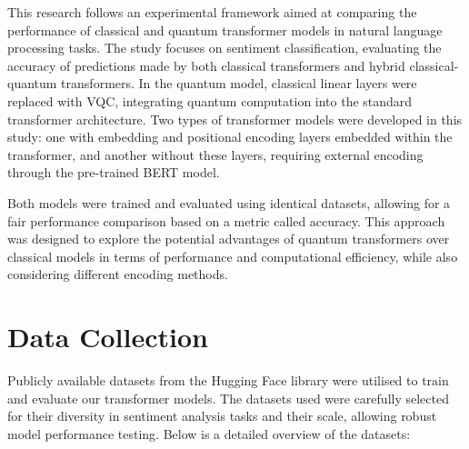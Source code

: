 This research follows an experimental framework aimed at comparing
the performance of classical and quantum transformer models in
natural language processing tasks. The study focuses on sentiment
classification, evaluating the accuracy of predictions made by both
classical transformers and hybrid classical-quantum transformers. In
the quantum model, classical linear layers were replaced with
\acrfull{VQC}, integrating quantum computation
into the standard transformer architecture. Two
types of transformer models were developed in this study: one with
embedding and positional encoding layers embedded within the
transformer, and another without these layers, requiring external
encoding through the pre-trained \gls{BERT} model.

Both models were trained and evaluated using identical datasets,
allowing for a fair performance comparison based on a metric called
accuracy. This approach was designed to explore the
potential advantages of quantum transformers over classical models in
terms of performance and computational efficiency, while also
considering different encoding methods.

\section{Data Collection}
\label{sec:data_collection}
Publicly available datasets from the Hugging Face library were
utilised to train and evaluate our transformer models.
The datasets used were carefully selected for their diversity in
sentiment analysis tasks and their scale, allowing robust model
performance testing. Below is a detailed overview of the datasets:

